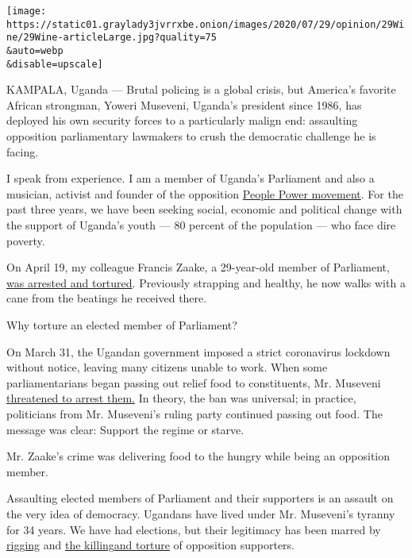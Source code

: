 \texttt{[image: https://static01.graylady3jvrrxbe.onion/images/2020/07/29/opinion/29Wine/29Wine-articleLarge.jpg?quality=75\\\&auto=webp\\\&disable=upscale]}

KAMPALA, Uganda --- Brutal policing is a global crisis, but America's
favorite African strongman, Yoweri Museveni, Uganda's president since
1986, has deployed his own security forces to a particularly malign end:
assaulting opposition parliamentary lawmakers to crush the democratic
challenge he is facing.

I speak from experience. I am a member of Uganda's Parliament and also a
musician, activist and founder of the opposition
\href{https://www.thenation.com/article/archive/can-bobi-wine-unite-uganda-and-bring-down-a-dictator/}{People
Power movement}. For the past three years, we have been seeking social,
economic and political change with the support of Uganda's youth --- 80
percent of the population --- who face dire poverty.

On April 19, my colleague Francis Zaake, a 29-year-old member of
Parliament,
\href{https://www.buzzfeednews.com/article/lesterfeder/uganda-francis-zaake-coronavirus}{was
arrested and tortured}. Previously strapping and healthy, he now walks
with a cane from the beatings he received there.

Why torture an elected member of Parliament?

On March 31, the Ugandan government imposed a strict coronavirus
lockdown without notice, leaving many citizens unable to work. When some
parliamentarians began passing out relief food to constituents, Mr.
Museveni
\href{https://www.softpower.ug/covid-19-mps-nsereko-luttamaguzi-risk-being-arrested-for-distributing-food/}{threatened
to arrest them.} In theory, the ban was universal; in practice,
politicians from Mr. Museveni's ruling party continued passing out food.
The message was clear: Support the regime or starve.

Mr. Zaake's crime was delivering food to the hungry while being an
opposition member.

Assaulting elected members of Parliament and their supporters is an
assault on the very idea of democracy. Ugandans have lived under Mr.
Museveni's tyranny for 34 years. We have had elections, but their
legitimacy has been marred by
\href{https://www.nybooks.com/daily/2016/05/16/uganda-cost-of-fake-democracy/}{rigging}
and
\href{https://www.hrw.org/news/2005/12/19/uganda-respect-opposition-right-campaign}{the
killing}\href{https://www.theguardian.com/world/2006/feb/26/uganda.deniscampbell}{and
torture} of opposition supporters.

